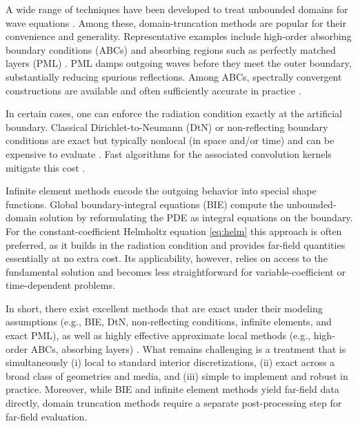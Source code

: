 \documentclass[onefignum,onetabnum]{siamart190516}
\begin{document}
A wide range of techniques have been developed to treat unbounded domains for wave equations \cite{givoli2013numerical}. Among these, domain-truncation methods are popular for their convenience and generality. Representative examples include high-order absorbing boundary conditions (ABCs) \cite{EngquistMajda77, BaylissTurkel80} and absorbing regions such as perfectly matched layers (PML) \cite{israeli1981approximation, BERENGER1994185}. PML damps outgoing waves before they meet the outer boundary, substantially reducing spurious reflections. Among ABCs, spectrally convergent constructions are available and often sufficiently accurate in practice \cite{hagstrom2009complete}.


In certain cases, one can enforce the radiation condition exactly at the artificial boundary. Classical Dirichlet-to-Neumann (DtN) or non-reflecting boundary conditions are exact but typically nonlocal (in space and/or time) and can be expensive to evaluate \cite{keller1989exact, GROTE1998327, grote1996nonreflecting}. Fast algorithms for the associated convolution kernels mitigate this cost \cite{alpert2000rapid}. 

Infinite element methods \cite{demkowicz2006few, halla2016convergence, nannen2022complex} encode the outgoing behavior into special shape functions. Global boundary-integral equations (BIE) \cite{chandler2012numerical, klockner2013quadrature} compute the unbounded-domain solution by reformulating the PDE as integral equations on the boundary. For the constant-coefficient Helmholtz equation \eqref{eq:helm} this approach is often preferred, as it builds in the radiation condition and provides far-field quantities essentially at no extra cost. Its applicability, however, relies on access to the fundamental solution and becomes less straightforward for variable-coefficient or time-dependent problems.

In short, there exist excellent methods that are exact under their modeling assumptions (e.g., BIE, DtN, non-reflecting conditions, infinite elements, and exact PML), as well as highly effective approximate local methods (e.g., high-order ABCs, absorbing layers) \cite{givoli2013numerical, 9196168, kirby2020finite, papadimitropoulos2020double, petropavlovsky2020numerical}. What remains challenging is a treatment that is simultaneously (i) local to standard interior discretizations, (ii) exact across a broad class of geometries and media, and (iii) simple to implement and robust in practice. Moreover, while BIE and infinite element methods yield far-field data directly, domain truncation methods require a separate post-processing step for far-field evaluation.
\end{document}
